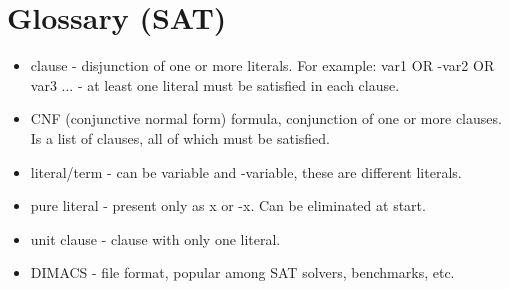 ﻿\chapter{Glossary (SAT)}

\begin{itemize}

\item clause - disjunction of one or more literals. For example: var1 OR -var2 OR var3 ... - at least one literal must be satisfied in each clause.

\item CNF (conjunctive normal form) formula, conjunction of one or more clauses. Is a list of clauses, all of which must be satisfied.

\item literal/term - can be variable and -variable, these are different literals.

\item pure literal - present only as x or -x. Can be eliminated at start.

\item unit clause - clause with only one literal.

\item DIMACS - file format, popular among SAT solvers, benchmarks, etc.

\end{itemize}
